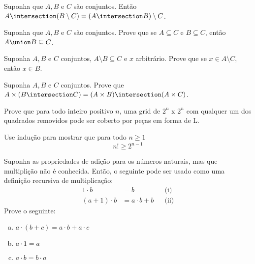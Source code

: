 \begin{exercise}
	Suponha que $A, B$ e $C$ são conjuntos. Então $A \intersection (B \setminus C) = (A \intersection B) \setminus C$.
\end{exercise}

\begin{exercise}
	Suponha que $A, B$ e $C$ são conjuntos. Prove que se $A \subseteq C$ e $B \subseteq C$, então $A \union B \subseteq C$.
\end{exercise}

\begin{exercise}
	Suponha $A, B$ e $C$ conjuntos, $A \setminus B \subseteq C$ e $x$ arbitrário. Prove que se $x \in A \setminus C$, então $x \in B$.
\end{exercise}

\begin{exercise}
	Suponha $A, B$ e $C$ conjuntos. Prove que $A \times (B \intersection C) = (A \times B) \intersection (A \times C)$.
\end{exercise}

\begin{exercise}
	Prove que para todo inteiro positivo $n$, uma grid de $2^n$ x $2^n$ com qualquer um dos quadrados removidos pode ser coberto por peças em forma de L.
\end{exercise}

\begin{exercise}
	Use indução para mostrar que para todo $n \geq 1$
	$$
	n! \geq 2^{n - 1} 
	$$
\end{exercise}

\begin{exercise}
	Suponha as propriedades de adição para os números naturais, mas que multiplição não é conhecida. Então, o seguinte pode ser usado como uma definição recursiva de multiplicação:
	$$
        \begin{aligned}
		    1 \cdot b &= b &&\text{(i)}\\
		    (a + 1) \cdot b &= a \cdot b + b &&\text{(ii)}
        \end{aligned}
	$$
	Prove o seguinte:
	\begin{enumerate}[(a)]
		\item $a \cdot (b + c) = a \cdot b + a \cdot c$
		\item $a \cdot 1 = a$
		\item $a \cdot b = b \cdot a$
	\end{enumerate}
\end{exercise}
